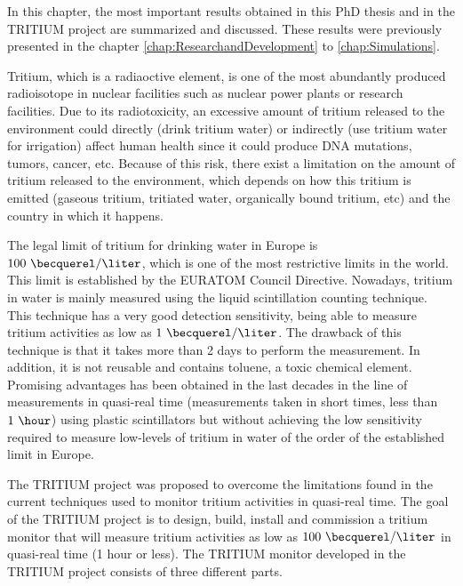 In this chapter, the most important results obtained in this PhD thesis and in the TRITIUM project are summarized and discussed. These results were previously presented in the chapter \ref{chap:ResearchandDevelopment} to \ref{chap:Simulations}.

Tritium, which is a radiaoctive element, is one of the most abundantly produced radioisotope in nuclear facilities such as nuclear power plants or research facilities. Due to its radiotoxicity, an excessive amount of tritium released to the environment could directly (drink tritium water) or indirectly (use tritium water for irrigation) affect human health since it could produce DNA mutations, tumors, cancer, etc. Because of this risk, there exist a limitation on the amount of tritium released to the environment, which depends on how this tritium is emitted (gaseous tritium, tritiated water, organically bound tritium, etc) and the country in which it happens.

The legal limit of tritium for drinking water in Europe is $100~\becquerel/\liter$, which is one of the most restrictive limits in the world. This limit is established by the EURATOM Council Directive. Nowadays, tritium in water is mainly measured using the liquid scintillation counting technique. This technique has a very good detection sensitivity, being able to measure tritium activities as low as $1~\becquerel/\liter$. The drawback of this technique is that it takes more than 2 days to perform the measurement. In addition, it is not reusable and contains toluene, a toxic chemical element. Promising advantages has been obtained in the last decades in the line of measurements in quasi-real time (measurements taken in short times, less than $1~\hour$) using plastic scintillators but without achieving the low sensitivity required to measure low-levels of tritium in water of the order of the established limit in Europe.

The TRITIUM project was proposed to overcome the limitations found in the current techniques used to monitor tritium activities in quasi-real time. The goal of the TRITIUM project is to design, build, install and commission a tritium monitor that will measure tritium activities as low as $100~\becquerel/\liter$  in quasi-real time (1 hour or less). The TRITIUM monitor developed in the TRITIUM project consists of three different parts.

